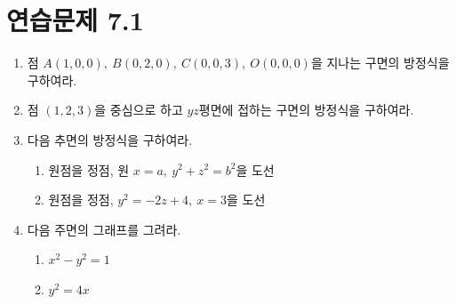 \documentclass{article}
\theoremstyle{mystyle}
\begin{document}
\section*{연습문제 7.1}
\begin{enumerate}
    \item 점 \(A(1,0,0),\ B(0,2,0),\ C(0,0,3),\ O(0,0,0)\)을 지나는 구면의 방정식을 구하여라.
    \item 점 \((1,2,3)\)을 중심으로 하고 \(yz\)평면에 접하는 구면의 방정식을 구하여라.
    \item 다음 추면의 방정식을 구하여라.
    \begin{enumerate}
        \item[(1)] 원점을 정점, 원 \(x=a,\ y^2+z^2=b^2\)을 도선
        \item[(2)] 원점을 정점, \(y^2=-2z+4,\ x=3\)을 도선
    \end{enumerate}
    \item 다음 주면의 그래프를 그려라.
    \begin{enumerate}
        \item[(1)] \(x^2-y^2=1\)
        \item[(2)] \(y^2=4x\)
    \end{enumerate}
\end{enumerate}
\end{document}
